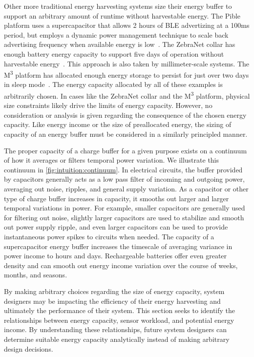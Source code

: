Other more traditional energy harvesting systems size their energy buffer to support an arbitrary amount of runtime without harvestable energy. 
The Pible platform uses a supercapacitor that allows 2 hours of BLE advertizing at a 100ms period, but employs a dynamic power management technique to scale back advertising frequency when available energy is low~\cite{fraternali2018pible}.
The ZebraNet collar has enough battery energy capacity to support five days of operation without harvestable energy~\cite{juang2002energy}. 
This approach is also taken by millimeter-scale systems. The M\textsuperscript{3} platform has allocated enough energy storage to persist for just over two days in sleep mode~\cite{lee2013modular}.
The energy capacity allocated by all of these examples is arbitrarily chosen. 
In cases like the ZebraNet collar and the M\textsuperscript{3} platform, physical size constraints likely drive the limits of energy capacity.
However, no consideration or analysis is given regarding the consequence of the chosen energy capacity.
Like energy income or the size of preallocated energy, the sizing of capacity of an energy buffer must be considered in a similarly principled manner.

The proper capacity of a charge buffer for a given purpose exists on a continuum of how it averages or filters temporal power variation. 
We illustrate this continuum in \cref{fig:intuition:continuum}.
In electrical circuits, the buffer provided by capacitors generally acts as a low pass filter of incoming and outgoing power, averaging out noise, ripples, and general supply variation.
As a capacitor or other type of charge buffer increases in capacity, it smooths out larger and larger temporal variations in power.
For example, smaller capacitors are generally used for filtering out noise, slightly larger capacitors are used to stabilize and smooth out power supply ripple, and even larger capacitors can be used to provide instantaneous power spikes to circuits when needed. 
The capacity of a supercapacitor energy buffer increases the timescale of averaging variance in power income to hours and days. 
Rechargeable batteries offer even greater density and can smooth out energy income variation over the course of weeks, months, and seasons. 

By making arbitrary choices regarding the size of energy capacity, system designers may be impacting the efficiency of their energy harvesting and ultimately the performance of their system. 
This section seeks to identify the relationships between energy capacity, sensor workload, and potential energy income.
By understanding these relationships, future system designers can determine suitable energy capacity analytically
instead of making arbitrary design decisions. 

